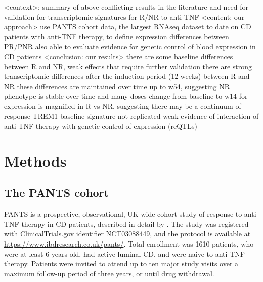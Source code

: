 \begin{outline}
\1 <context>: summary of above
    \2 conflicting results in the literature and need for validation for transcriptomic signatures for R/NR to anti-TNF 
\1 <content: our approach> 
    \2 use PANTS cohort data, the largest RNAseq dataset to date on CD patients with anti-TNF therapy, to define expression differences between PR/PNR
    \2 also able to evaluate evidence for genetic control of blood expression in CD patients
\1 <conclusion: our results> 
    \2 there are some baseline differences between R and NR, weak effects that require further validation
    \2 there are strong transcriptomic differences after the induction period (12 weeks) between R and NR
    \2 these differences are maintained over time up to w54, suggesting NR phenotype is stable over time and many doses
    \2 change from baseline to w14 for expression is magnified in R vs NR, suggesting there may be a continuum of response
    \2 TREM1 baseline signature not replicated
    \2 weak evidence of interaction of anti-TNF therapy with genetic control of expression (reQTLs)

\section{Methods}

\subsection{The PANTS cohort}

\gls{PANTS} is a prospective, observational, UK-wide cohort study of response to anti-\gls{TNF} therapy in \gls{CD} patients, described in detail by \textcite{kennedy2019PredictorsAntiTNFTreatment}.
The study was registered with ClinicalTrials.gov identifier NCT03088449, and the protocol is available at \url{https://www.ibdresearch.co.uk/pants/}.
Total enrollment was 1610 patients, who were at least 6 years old, had active luminal \gls{CD}, and were naive to anti-\gls{TNF} therapy.
Patients were invited to attend up to ten major study visits over a maximum follow-up period of three years, or until drug withdrawal.


\end{outline}
